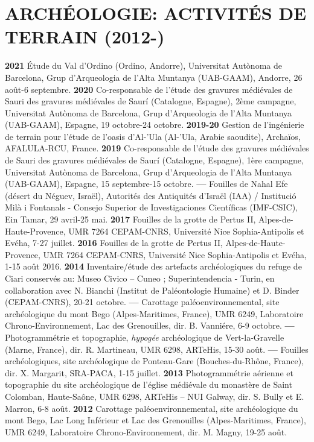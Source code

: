 \documentclass{article}
\begin{document}
\section{ARCHÉOLOGIE: ACTIVITÉS DE TERRAIN (2012-)}

\textbf{2021 }Étude du Val d'Ordino (Ordino, Andorre), Universitat Autònoma de Barcelona, Grup d'Arqueologia de l'Alta Muntanya (UAB-GAAM), Andorre, 26 août-6 septembre.
\smallbreak
\textbf{2020 }Co-responsable de l'étude des gravures médiévales de Sauri des gravures médiévales de Saurí (Catalogne, Espagne), 2ème campagne, Universitat Autònoma de Barcelona, Grup d'Arqueologia de l'Alta Muntanya (UAB-GAAM), Espagne, 19 octobre-24 octobre.
\smallbreak
\textbf{2019-20 }Gestion de l'ingénierie de terrain pour l'étude de l'oasis d'Al-'Ula (Al-'Ula, Arabie saoudite), Archaïos, AFALULA-RCU, France.
\smallbreak
\textbf{2019 }Co-responsable de l'étude des gravures médiévales de Sauri des gravures médiévales de Saurí (Catalogne, Espagne), 1ère campagne, Universitat Autònoma de Barcelona, Grup d'Arqueologia de l'Alta Muntanya (UAB-GAAM), Espagne, 15 septembre-15 octobre.
\smallbreak
\textbf{--- }Fouilles de Nahal Efe (désert du Néguev, Israël), Autorités des Antiquités d'Israël (IAA) / Institució Milà i Fontanals - Consejo Superior de Investigaciones Científicas (IMF-CSIC), Ein Tamar, 29 avril-25 mai.
\smallbreak
\textbf{2017 }Fouilles de la grotte de Pertus II, Alpes-de-Haute-Provence, UMR 7264 CEPAM-CNRS, Université Nice Sophia-Antipolis et Evéha, 7-27 juillet.
\smallbreak
\textbf{2016 }Fouilles de la grotte de Pertus II, Alpes-de-Haute-Provence, UMR 7264 CEPAM-CNRS, Université Nice Sophia-Antipolis et Evéha, 1-15 août 2016.
\smallbreak
\textbf{2014 }Inventaire/étude des artefacts archéologiques du refuge de Ciari conservés au: Museo Civico -- Cuneo ; Superintendencia - Turin, en collaboration avec N. Bianchi (Institut de Paléontologie Humaine) et D. Binder (CEPAM-CNRS), 20-21 octobre.
\smallbreak
\textbf{--- }Carottage paléoenvironnemental, site archéologique du mont Bego (Alpes-Maritimes, France), UMR 6249, Laboratoire Chrono-Environnement, Lac des Grenouilles, dir. B. Vanniére, 6-9 octobre.
\smallbreak
\textbf{--- }Photogrammétrie et topographie, \textit{hypogée} archéologique de Vert-la-Gravelle (Marne, France), dir. R. Martineau, UMR 6298, ARTeHis, 15-30 août.
\smallbreak
\textbf{--- }Fouilles archéologiques, site archéologique de Ponteau-Gare (Bouches-du-Rhône, France), dir. X. Margarit, SRA-PACA, 1-15 juillet.
\smallbreak
\textbf{2013 }Photogrammétrie aérienne et topographie du site archéologique de l'église médiévale du monastère de Saint Colomban, Haute-Saône, UMR 6298, ARTeHis -- NUI Galway, dir. S. Bully et E. Marron, 6-8 août.
\smallbreak
\textbf{2012 }Carottage paléoenvironnemental, site archéologique du mont Bego, Lac Long Inférieur et Lac des Grenouilles (Alpes-Maritimes, France), UMR 6249, Laboratoire Chrono-Environnement, dir. M. Magny, 19-25 août.
\end{document}
